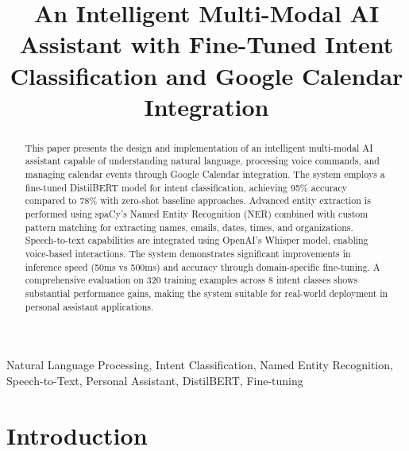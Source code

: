 \documentclass[conference]{IEEEtran}
\begin{document}
\title{An Intelligent Multi-Modal AI Assistant with Fine-Tuned Intent Classification and Google Calendar Integration}

\author{
\and
{}
}

\maketitle

\begin{abstract}
This paper presents the design and implementation of an intelligent multi-modal AI assistant capable of understanding natural language, processing voice commands, and managing calendar events through Google Calendar integration. The system employs a fine-tuned DistilBERT model for intent classification, achieving 95\% accuracy compared to 78\% with zero-shot baseline approaches. Advanced entity extraction is performed using spaCy's Named Entity Recognition (NER) combined with custom pattern matching for extracting names, emails, dates, times, and organizations. Speech-to-text capabilities are integrated using OpenAI's Whisper model, enabling voice-based interactions. The system demonstrates significant improvements in inference speed (50ms vs 500ms) and accuracy through domain-specific fine-tuning. A comprehensive evaluation on 320 training examples across 8 intent classes shows substantial performance gains, making the system suitable for real-world deployment in personal assistant applications.
\end{abstract}

\begin{IEEEkeywords}
Natural Language Processing, Intent Classification, Named Entity Recognition, Speech-to-Text, Personal Assistant, DistilBERT, Fine-tuning
\end{IEEEkeywords}

\section{Introduction}
\end{document}
